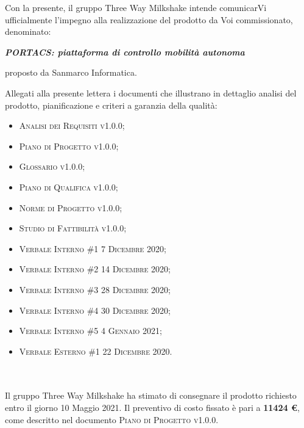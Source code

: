 \documentclass[10pt,stdletter,dateno,sigright]{newlfm}  %
\begin{document}
    \begin{newlfm}


        Con la presente, il gruppo Three Way Milkshake intende comunicarVi ufficialmente l'impegno alla realizzazione del prodotto da Voi commissionato, denominato:
        \begin{center}
            \textbf{\textit{PORTACS: piattaforma di controllo mobilità autonoma}}
        \end{center}
        proposto da Sanmarco Informatica.

        Allegati alla presente lettera i documenti che illustrano in dettaglio analisi del prodotto, pianificazione e criteri a garanzia della qualità:

        \begin{itemize}
            \item \textsc{Analisi dei Requisiti v1.0.0;}
            \item \textsc{Piano di Progetto v1.0.0;}
            \item \textsc{Glossario v1.0.0;}
            \item \textsc{Piano di Qualifica v1.0.0;}
            \item \textsc{Norme di Progetto v1.0.0;}
            \item \textsc{Studio di Fattibilità v1.0.0;}
            \item \textsc{Verbale Interno \#1 7 Dicembre 2020;}
            \item \textsc{Verbale Interno \#2 14 Dicembre 2020;}
            \item \textsc{Verbale Interno \#3 28 Dicembre 2020;}
            \item \textsc{Verbale Interno \#4 30 Dicembre 2020;}
            \item \textsc{Verbale Interno \#5 4 Gennaio 2021;}
            \item \textsc{Verbale Esterno \#1 22 Dicembre 2020.}
        \end{itemize}
        \ \\
        \ \\
        Il gruppo Three Way Milkshake ha stimato di consegnare il prodotto richiesto entro il giorno 10 Maggio 2021.
        Il preventivo di costo fissato \`e pari a \textbf{11424  \euro}, come descritto nel documento \textsc{Piano di Progetto v1.0.0}.
        \\


\end{newlfm}
\end{document}
